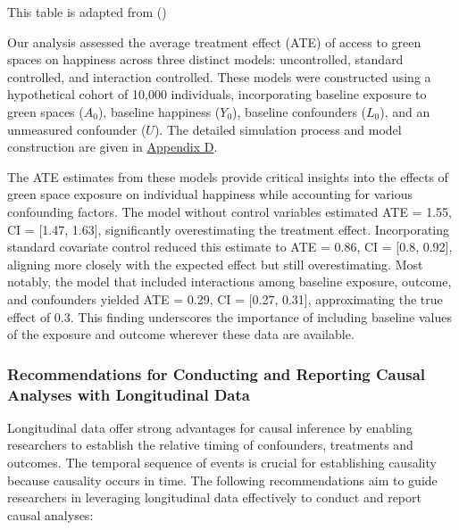 \documentclass[
  singlecolumn]{article}
\begin{document}
\begin{table}

\caption{\label{tbl-lg}This table is adapted from
()}

\centering{

\examplelongitudinal

}

\end{table}%

Our analysis assessed the average treatment effect (ATE) of access to
green spaces on happiness across three distinct models: uncontrolled,
standard controlled, and interaction controlled. These models were
constructed using a hypothetical cohort of 10,000 individuals,
incorporating baseline exposure to green spaces (\(A_0\)), baseline
happiness (\(Y_0\)), baseline confounders (\(L_0\)), and an unmeasured
confounder (\(U\)). The detailed simulation process and model
construction are given in
\hyperref[appendix-simulate-longitudinal-ate]{Appendix D}.

The ATE estimates from these models provide critical insights into the
effects of green space exposure on individual happiness while accounting
for various confounding factors. The model without control variables
estimated ATE = 1.55, CI = {[}1.47, 1.63{]}, significantly
overestimating the treatment effect. Incorporating standard covariate
control reduced this estimate to ATE = 0.86, CI = {[}0.8, 0.92{]},
aligning more closely with the expected effect but still overestimating.
Most notably, the model that included interactions among baseline
exposure, outcome, and confounders yielded ATE = 0.29, CI = {[}0.27,
0.31{]}, approximating the true effect of 0.3. This finding underscores
the importance of including baseline values of the exposure and outcome
wherever these data are available.

\subsubsection{Recommendations for Conducting and Reporting Causal
Analyses with Longitudinal
Data}\label{recommendations-for-conducting-and-reporting-causal-analyses-with-longitudinal-data}

Longitudinal data offer strong advantages for causal inference by
enabling researchers to establish the relative timing of confounders,
treatments and outcomes. The temporal sequence of events is crucial for
establishing causality because causality occurs in time. The following
recommendations aim to guide researchers in leveraging longitudinal data
effectively to conduct and report causal analyses:
\end{document}

